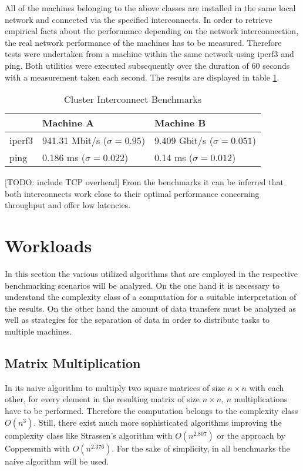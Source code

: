 All of the machines belonging to the above classes are installed in the same local network and connected via the specified interconnects. In order to retrieve empirical facts about the performance depending on the network interconnection, the real network performance of the machines has to be measured. Therefore tests were undertaken from a machine within the same network using iperf3 and ping. Both utilities were executed subsequently over the duration of 60 seconds with a measurement taken each second. The results are displayed in table \ref{table:cluster_interconnect_benchmarks}.

\begin{table}[!htb]
	\centering
	\begin{adjustbox}{width=0.5\textwidth}
		\small
		\begin{tabular}{l | l | l}
			~                     & Machine A                 			& Machine B                  \\
			\hline
			iperf3                & 941.31 Mbit/s ($\sigma = 0.95$) 	& 9.409 Gbit/s ($\sigma = 0.051$) \\
			ping                  & 0.186 ms ($\sigma = 0.022$)  		& 0.14 ms ($\sigma = 0.012$)  \\
		\end{tabular}
	\end{adjustbox}
	
	\caption{Cluster Interconnect Benchmarks}
	\label{table:cluster_interconnect_benchmarks}
\end{table}

[TODO: include TCP overhead]
From the benchmarks it can be inferred that both interconnects work close to their optimal performance concerning throughput and offer low latencies.

\section{Workloads}
\label{workload_explanation}
In this section the various utilized algorithms that are employed in the respective benchmarking scenarios will be analyzed. On the one hand it is necessary to understand the complexity class of a computation for a suitable interpretation of the results. On the other hand the amount of data transfers must be analyzed as well as strategies for the separation of data in order to distribute tasks to multiple machines.

\subsection*{Matrix Multiplication}
In its naive algorithm to multiply two square matrices of size $n\times n$ with each other, for every element in the resulting matrix of size $n\times n$, $n$ multiplications have to be performed. Therefore the computation belongs to the complexity class $O(n^3)$. Still, there exist much more sophisticated algorithms improving the complexity class like Strassen's algorithm with $O(n^{2.807})$\cite{strassen} or the approach by Coppersmith with $O(n^{2.376})$\cite{coppersmith}. For the sake of simplicity, in all benchmarks the naive algorithm will be used.

